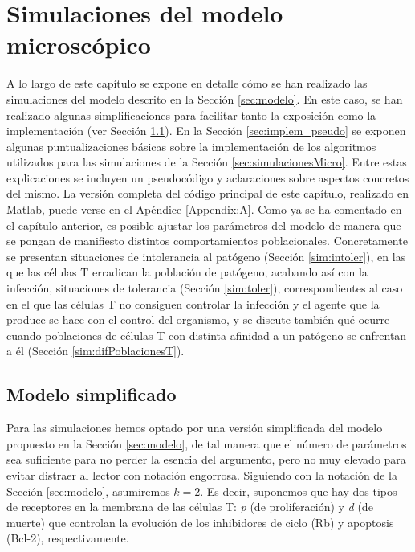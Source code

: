 
\chapter{Simulaciones del modelo microscópico}
\label{cap:simulaciones}

A lo largo de este capítulo se expone en detalle cómo se han realizado las simulaciones del modelo descrito en la Sección \ref{sec:modelo}. En este caso, se han realizado algunas simplificaciones para facilitar tanto la exposición como la implementación (ver Sección \ref{sec:modelo_simplif}). En la Sección \ref{sec:implem_pseudo} se exponen algunas puntualizaciones básicas sobre la implementación de los algoritmos utilizados para las simulaciones de la Sección \ref{sec:simulacionesMicro}. Entre estas explicaciones se incluyen un pseudocódigo y aclaraciones sobre aspectos concretos del mismo. La versión completa del código principal de este capítulo, realizado en Matlab, puede verse en el Apéndice \ref{Appendix:A}. Como ya se ha comentado en el capítulo anterior, es posible ajustar los parámetros del modelo de manera que se pongan de manifiesto distintos comportamientos poblacionales. Concretamente se presentan situaciones de intolerancia al patógeno (Sección \ref{sim:intoler}), en las que las células T erradican la población de patógeno, acabando así con la infección, situaciones de tolerancia (Sección \ref{sim:toler}), correspondientes al caso en el que las células T no consiguen controlar la infección y el agente que la produce se hace con el control del organismo, y se discute también qué ocurre cuando poblaciones de células T con distinta afinidad a un patógeno se enfrentan a él (Sección \ref{sim:difPoblacionesT}).


\section{Modelo simplificado}
\label{sec:modelo_simplif}

Para las simulaciones hemos optado por una versión simplificada del modelo propuesto en la Sección \ref{sec:modelo}, de tal manera que el número de parámetros sea suficiente para no perder la esencia del argumento, pero no muy elevado para evitar distraer al lector con notación engorrosa. Siguiendo con la notación de la Sección \ref{sec:modelo}, asumiremos $k=2$. Es decir, suponemos que hay dos tipos de receptores en la membrana de las células T: \textit{p} (de proliferación) y \textit{d} (de muerte) que controlan la evolución de los inhibidores de ciclo (Rb) y apoptosis (Bcl-2), respectivamente.

